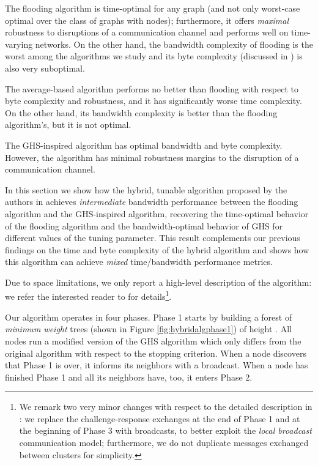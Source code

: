 \documentclass[letterpaper,10pt,conference]{ieeeconf}
\begin{document}
The flooding algorithm is time-optimal for any graph (and not only worst-case optimal over the class  of graphs with  nodes); furthermore, it offers \emph{maximal} robustness to disruptions of a communication channel and performs well on time-varying networks. On the other hand, the bandwidth complexity of flooding is the worst among the algorithms we study and its byte complexity (discussed in \cite{FR-MP:13}) is also very suboptimal.

The average-based algorithm performs no better than flooding with respect to byte complexity and robustness, and it has significantly worse time complexity. On the other hand, its bandwidth complexity is better than the flooding algorithm's, but it is not optimal.

The GHS-inspired algorithm has optimal bandwidth and byte complexity. However, the algorithm has minimal robustness margins to the disruption of a communication channel.

In this section we show how the hybrid, tunable algorithm proposed by the authors in \cite{FR-MP:13} achieves \emph{intermediate} bandwidth performance between the flooding algorithm and the GHS-inspired algorithm, recovering the time-optimal behavior of the flooding algorithm and the bandwidth-optimal behavior of GHS for different values of the tuning parameter. This result complements our previous findings on the time and byte complexity of the hybrid algorithm and shows how this algorithm can achieve \emph{mixed} time/bandwidth performance metrics. 

Due to space limitations, we only report a high-level description of the algorithm: we refer the interested reader to \cite{FR-MP:13} for details\footnote{We remark two very minor changes with respect to the detailed description in \cite{FR-MP:13}: we replace the challenge-response exchanges at the end of Phase 1 and at the beginning of Phase 3 with broadcasts, to better exploit the \emph{local broadcast} communication model; furthermore, we do not duplicate messages exchanged between clusters for simplicity.}.

Our algorithm operates in four phases. 
Phase 1 starts by building a forest of \emph{minimum weight} trees (shown in Figure \ref{fig:hybridalgphase1}) of height . 
All nodes run a modified version of the GHS algorithm \cite{RGG-PAH-PMS:83} which only differs from the original algorithm with respect to the stopping criterion. When a node discovers that Phase 1 is over, it informs its neighbors with a broadcast. When a node has finished Phase 1 and all its neighbors have, too, it enters Phase 2.
\end{document}
